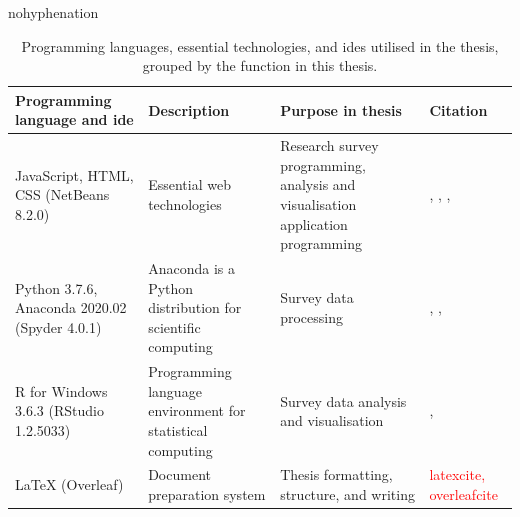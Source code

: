 \begin{hyphenrules}{nohyphenation}
    \begin{table}[H]
        \centering
        \caption[Thesis programming languages]{Programming languages, essential technologies, and \glspl{ide} utilised in the thesis, grouped by the function in this thesis.} 
        \label{tab:used_langs}
        \def\arraystretch{1.4}
        \setlength\tabcolsep{1.2ex}
        \begin{tabular}{ @{} >{\raggedright\arraybackslash}p{3cm} >{\raggedright\arraybackslash}p{4.5cm} >{\raggedright\arraybackslash}p{3.5cm} >{\raggedleft\arraybackslash}p{3.5cm} @{} }
            \toprule
            Programming language and \gls{ide} & Description & Purpose in thesis & Citation \\
            \midrule
            JavaScript, HTML, CSS (NetBeans 8.2.0) & Essential web technologies & Research survey programming, analysis and visualisation application programming & \cite{WHATWG2020}, \cite{W3C2020}, \cite{ECMA2019}, \cite{ApacheSoftwareFoundation2016} \\
            Python 3.7.6, Anaconda 2020.02 (Spyder 4.0.1) & Anaconda is a Python distribution for scientific computing & Survey data processing & \cite{Python3Reference}, \cite{AnacondaInc.2020}, \cite{SpyderProjectContributors2020} \\
            R for Windows 3.6.3 (RStudio 1.2.5033) & Programming language environment for statistical computing & Survey data analysis and visualisation & \cite{RCoreTeam2020}, \cite{RStudioTeam2015} \\
            LaTeX (Overleaf) & Document preparation system & Thesis formatting, structure, and writing & \textcolor{red}{latexcite, overleafcite} \\
            \bottomrule
        \end{tabular}
    \end{table} 
\end{hyphenrules}

